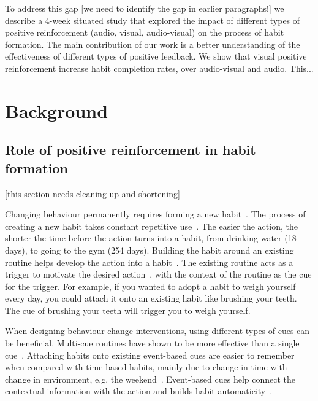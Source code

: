 \documentclass{scaffold/sigchi}
\begin{document}
To address this gap [we need to identify the gap in earlier paragraphs!] we describe a 4-week situated study that explored the impact of different types of positive reinforcement (audio, visual, audio-visual) on the process of habit formation. The main contribution of our work is a better understanding of the effectiveness of different types of positive feedback. We show that visual positive reinforcement increase habit completion rates, over audio-visual and audio. This...



\section{Background}
\subsection{Role of positive reinforcement in habit formation}
[this section needs cleaning up and shortening]

Changing behaviour permanently requires forming a new habit~\cite{article_experiences_of_habit_formation}. The process of creating a new habit takes constant repetitive use~\cite{article_how_habits_formed_modelling_habit_formation}. The easier the action, the shorter the time before the action turns into a habit, from drinking water (18 days), to going to the gym (254 days). Building the habit around an existing routine helps develop the action into a habit~\cite{habits_event_cues_1}. The existing routine acts as a trigger to motivate the desired action~\cite{habits_event_cues_2}, with the context of the routine as the cue for the trigger. For example, if you wanted to adopt a habit to weigh yourself every day, you could attach it onto an existing habit like brushing your teeth. The cue of brushing your teeth will trigger you to weigh yourself.


When designing behaviour change interventions, using different types of cues can be beneficial. Multi-cue routines have shown to be more effective than a single cue~\cite{article_understanding_use_contextual_cues_design_impl}. Attaching habits onto existing event-based cues are easier to remember~\cite{article_implementation_intentions_multicue} when compared with time-based habits, mainly due to change in time with change in environment, e.g. the weekend~\cite{coaching_not_that_good}. Event-based cues help connect the contextual information with the action and builds habit automaticity~\cite{article_implementation_intentions}.
 
\end{document}
